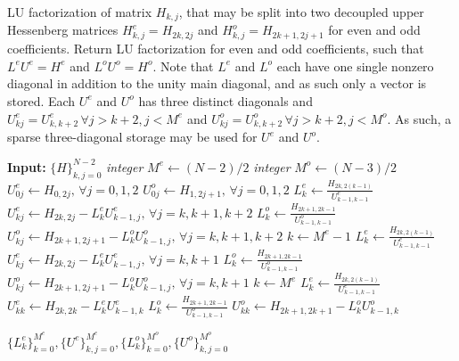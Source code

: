 \documentclass[11pt, oneside]{article}
\begin{document}
\begin{algorithm}
\caption{LU factorization of matrix $H_{k,j}$, that may be split into two 
decoupled upper Hessenberg matrices $H^e_{k,j} = H_{2k,2j}$ and $H^o_{k,j} = 
H_{2k+1,2j+1}$ for even and odd coefficients. Return LU factorization for even 
and odd coefficients, such that $L^eU^e=H^e$ and $L^oU^o=H^o$. Note that 
$L^{e}$ and $L^{o}$ each have one single nonzero diagonal in addition to the 
unity main diagonal, and as such only a vector is stored. Each $U^{e}$ and 
$U^{o}$ has three distinct diagonals and $U^{e}_{kj}=U^{e}_{k, k+2} \,\forall 
j 
> k+2, j< M^e$ and $U^{o}_{kj}=U^{o}_{k, k+2} \,\forall j > k+2, j< M^o$. As 
such, a sparse three-diagonal storage may be used for $U^e$ and $U^o$.}
\label{alg:lu}
\begin{algorithmic}[1]
  \State \textbf{Input:} $\{H\}_{k,j=0}^{N-2}$
  \State \textit{integer} $M^e \gets (N-2)/2$
  \State \textit{integer} $M^o \gets (N-3)/2$
  \State ${U}^e_{0j} \gets {H}_{0,2j}, \, \forall j=0,1,2 $
  \State ${U}^o_{0j} \gets {H}_{1,2j+1}, \, \forall j=0,1,2 $
    \State ${L}^e_{k} \gets \frac{{H}_{2k,2(k-1)}}{{U}^e_{k-1,k-1}}$
    \State ${U}^e_{kj} \gets {H}_{2k,2j} - {L}^e_{k}{U}^e_{k-1,j}, \, \forall 
j=k, k+1, k+2$
    \State ${L}^o_{k} \gets \frac{{H}_{2k+1,2k-1}}{{U}^o_{k-1,k-1}}$
    \State ${U}^o_{kj} \gets {H}_{2k+1,2j+1} - {L}^o_{k}{U}^o_{k-1,j}, \, 
\forall j=k, k+1, k+2$
  \EndFor
  \State $k \gets M^e-1$
  \State ${L}^e_{k} \gets \frac{{H}_{2k,2(k-1)}}{{U}^e_{k-1,k-1}}$
  \State ${U}^e_{kj} \gets {H}_{2k,2j} - {L}^e_{k}{U}^e_{k-1,j}, \, \forall 
j=k, k+1$
  \State ${L}^o_{k} \gets \frac{{H}_{2k+1,2k-1}}{{U}^o_{k-1,k-1}}$
  \State ${U}^o_{kj} \gets {H}_{2k+1,2j+1} - {L}^o_{k}{U}^o_{k-1,j}, \, 
\forall j=k, k+1$
  \State $k \gets M^e$
  \State ${L}^e_{k} \gets \frac{{H}_{2k,2(k-1)}}{{U}^e_{k-1,k-1}}$
  \State ${U}^e_{kk} \gets {H}_{2k,2k} - {L}^e_{k}{U}^e_{k-1,k}$
    \State ${L}^o_{k} \gets \frac{{H}_{2k+1,2k-1}}{{U}^o_{k-1,k-1}}$
    \State ${U}^o_{kk} \gets {H}_{2k+1,2k+1} - {L}^o_{k}{U}^o_{k-1,k}$

  \EndIf  
  \State \Return $\{L^e_k\}_{k=0}^{M^e},\{U^e\}_{k,j=0}^{M^e}, 
\{L^o_k\}_{k=0}^{M^o},\{U^o\}_{k,j=0}^{M^o}$
\EndProcedure
\end{algorithmic}
\end{algorithm}
\end{document}
